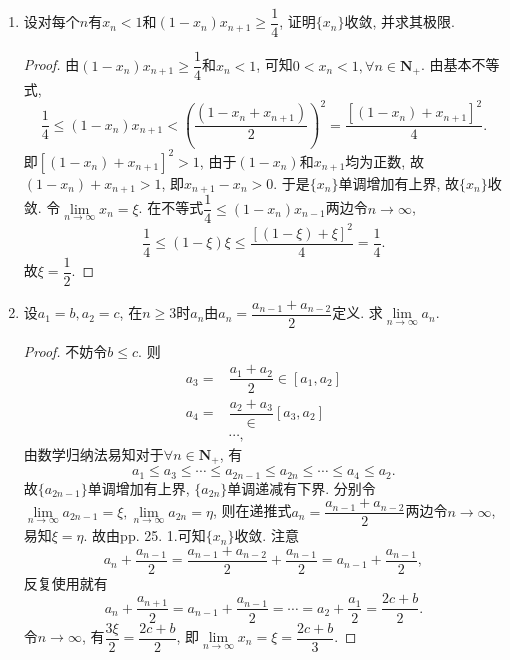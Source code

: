 \documentclass[a4paper,11pt,twoside]{ctexbook}
\begin{document}
\begin{enumerate}
	\item 设对每个$n$有$x_n<1$和$(1-x_n)x_{n+1}\geqslant \dfrac{1}{4}$, 证明$\{x_n\}$收敛, 并求其极限.
	      \begin{proof}
		      由$(1-x_n)x_{n+1}\geqslant \dfrac{1}{4}$和$x_n<1$, 可知$0<x_n<1, \forall n\in\mathbf{N}_{+}$. 由基本不等式,
		      \[
			      \dfrac{1}{4}\leqslant (1-x_n)x_{n+1}<\left(\dfrac{(1-x_n+x_{n+1})}{2}\right)^2=\dfrac{[(1-x_n)+x_{n+1}]^2}{4}.
		      \]
		      即$[(1-x_n)+x_{n+1}]^2>1$, 由于$(1-x_n)$和$x_{n+1}$均为正数, 故$(1-x_n)+x_{n+1}>1$, 即$x_{n+1}-x_n>0$. 于是$\{x_n\}$单调增加有上界, 故$\{x_n\}$收敛. 令$\lim\limits_{n\to\infty} x_n=\xi$. 在不等式$\dfrac{1}{4}\leqslant(1-x_n)x_{n-1}$两边令$n\to\infty$,
		      \[
			      \dfrac{1}{4}\leqslant (1-\xi)\xi \leqslant\dfrac{[(1-\xi)+\xi]^2}{4}=\dfrac{1}{4}.
		      \]
		      故$\xi=\dfrac{1}{2}$. \qedhere
	      \end{proof}

	\item 设$a_1=b, a_2=c$, 在$n\geqslant 3$时$a_n$由$a_n=\dfrac{a_{n-1}+a_{n-2}}{2}$定义. 求$\lim\limits_{n\to\infty} a_n$.
	      \begin{proof}
		      不妨令$b\leqslant c$. 则
		      \[
			      \begin{split}
				      a_3=&\dfrac{a_1+a_2}{2}\in[a_1,a_2]\\
				      a_4=&\dfrac{a_2+a_3}\in[a_3, a_2]\\
				      &\cdots,
			      \end{split}
		      \]
		      由数学归纳法易知对于$\forall n\in\mathbf{N}_{+}$, 有
		      \[
			      a_1\leqslant a_3\leqslant\cdots\leqslant a_{2n-1}\leqslant a_{2n}\leqslant\cdots\leqslant a_4\leqslant a_2.
		      \]
		      故$\{a_{2n-1}\}$单调增加有上界, $\{a_{2n}\}$单调递减有下界. 分别令$\lim\limits_{n\to\infty} a_{2n-1}=\xi, \lim\limits_{n\to\infty} a_{2n}=\eta$, 则在递推式$a_n=\dfrac{a_{n-1}+a_{n-2}}{2}$两边令$n\to\infty$, 易知$\xi=\eta$. 故由pp. 25. 1.可知$\{x_n\}$收敛. 注意
		      \[
			      a_n+\dfrac{a_{n-1}}{2}=\dfrac{a_{n-1}+a_{n-2}}{2}+\dfrac{a_{n-1}}{2}=a_{n-1}+\dfrac{a_{n-1}}{2},
		      \]
		      反复使用就有
		      \[
			      a_n+\dfrac{a_{n+1}}{2}=a_{n-1}+\dfrac{a_{n-1}}{2}=\cdots=a_2+\dfrac{a_1}{2}=\dfrac{2c+b}{2}.
		      \]
		      令$n\to\infty$, 有$\dfrac{3\xi}{2}=\dfrac{2c+b}{2}$, 即$\lim\limits_{n\to\infty} x_n=\xi=\dfrac{2c+b}{3}$. \qedhere
	      \end{proof}


\end{enumerate}
\end{document}

